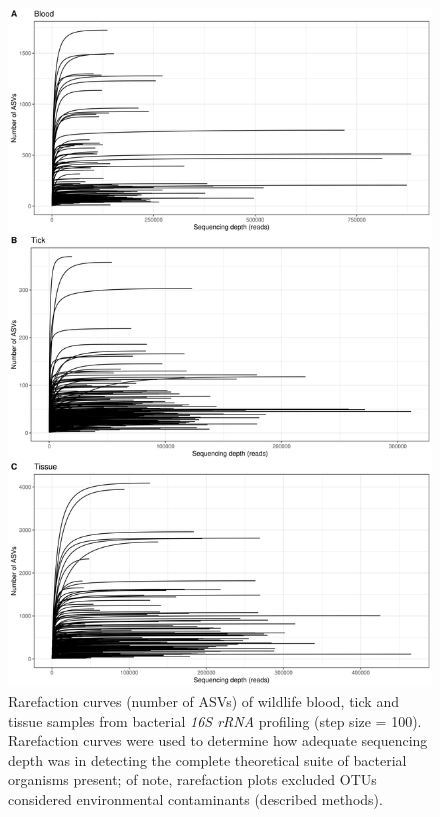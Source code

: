 \documentclass[a4paper, nobind]{templates/ociamthesis}
\begin{document}
\begin{figure}
\includegraphics[width=0.85\linewidth]{figures/ms-figs-appendix/FigA-3.2} \caption[Rarefaction curves of bacterial \textit{16S rRNA} sequencing from wildlife samples.]{Rarefaction curves (number of ASVs) of wildlife blood, tick and tissue samples from bacterial \textit{16S rRNA} profiling (step size = 100). Rarefaction curves were used to determine how adequate sequencing depth was in detecting the complete theoretical suite of bacterial organisms present; of note, rarefaction plots excluded OTUs considered environmental contaminants (described methods).}\label{fig:FA32}
\end{figure}

\newpage
\end{document}

